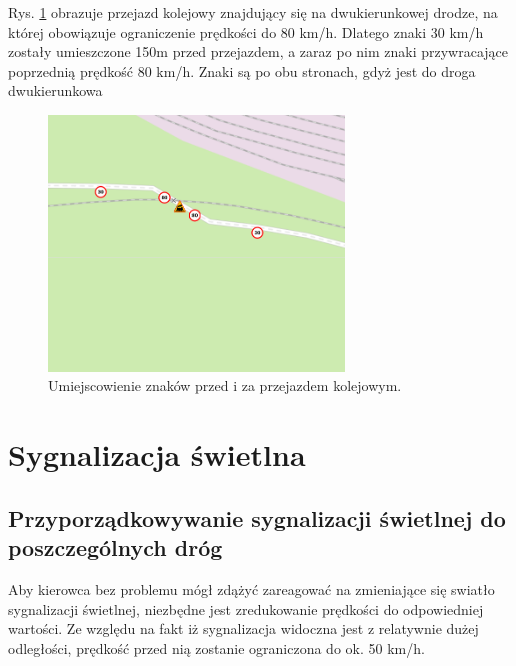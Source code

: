 Rys. \ref{sec:PrzejazdyKolejowe} obrazuje przejazd kolejowy znajdujący się na dwukierunkowej drodze, na której obowiązuje ograniczenie prędkości do 80 km/h. Dlatego znaki 30 km/h zostały umieszczone 150m przed przejazdem, a zaraz po nim znaki przywracające poprzednią prędkość 80 km/h. Znaki są po obu stronach, gdyż jest do droga dwukierunkowa

\begin{figure}[h]
\caption{Umiejscowienie znaków przed i za przejazdem kolejowym.}
\label{sec:PrzejazdyKolejowe}
\centering
\includegraphics[width=0.7\textwidth]{streetBeforeRail}
\end{figure}


\newpage
\section{Sygnalizacja świetlna}
\subsection{Przyporządkowywanie sygnalizacji świetlnej do poszczególnych dróg}

Aby kierowca bez problemu mógł zdążyć zareagować na zmieniające się swiatło sygnalizacji świetlnej, niezbędne jest zredukowanie prędkości do odpowiedniej wartości. Ze względu na fakt iż sygnalizacja widoczna jest z relatywnie dużej odległości, prędkość przed nią zostanie ograniczona do ok. 50 km/h.


